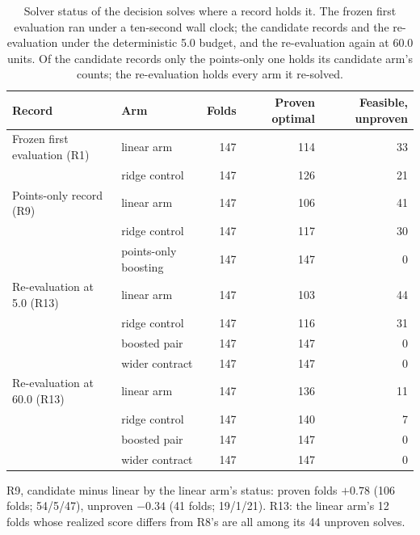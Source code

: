 \documentclass[11pt,a4paper]{article}
\begin{document}
\begin{table}[!htb]
\centering\small
\caption{Solver status of the decision solves where a record holds it. The frozen first evaluation ran under a ten-second wall clock; the candidate records and the re-evaluation under the deterministic 5.0 budget, and the re-evaluation again at 60.0 units. Of the candidate records only the points-only one holds its candidate arm's counts; the re-evaluation holds every arm it re-solved.}
\label{tab:status}
\begin{tabular}{l l rrr}
\toprule
Record & Arm & Folds & Proven optimal & Feasible, unproven \\
\midrule
Frozen first evaluation (R1) & linear arm & 147 & 114 & 33 \\
 & ridge control & 147 & 126 & 21 \\
Points-only record (R9) & linear arm & 147 & 106 & 41 \\
 & ridge control & 147 & 117 & 30 \\
 & points-only boosting & 147 & 147 & 0 \\
Re-evaluation at 5.0 (R13) & linear arm & 147 & 103 & 44 \\
 & ridge control & 147 & 116 & 31 \\
 & boosted pair & 147 & 147 & 0 \\
 & wider contract & 147 & 147 & 0 \\
Re-evaluation at 60.0 (R13) & linear arm & 147 & 136 & 11 \\
 & ridge control & 147 & 140 & 7 \\
 & boosted pair & 147 & 147 & 0 \\
 & wider contract & 147 & 147 & 0 \\
\bottomrule
\end{tabular}
\par\smallskip\footnotesize R9, candidate minus linear by the linear arm's status: proven folds $+0.78$ (106 folds; 54/5/47), unproven $-0.34$ (41 folds; 19/1/21). R13: the linear arm's 12 folds whose realized score differs from R8's are all among its 44 unproven solves.
\end{table}
\end{document}
